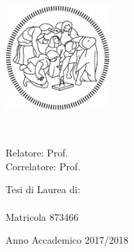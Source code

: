 \begin{titlepage}
    \begin{addmargin}[-1cm]{-3cm}
    \begin{center}
        \large
		\myUni \\
		\myFaculty \\
		\myDepartment \\ \bigskip
		\includegraphics[width=4cm]{gfx/logo} \\ \bigskip
        \vfill

        \begingroup
            \color{Maroon}\spacedallcaps{\myTitle} \\ \bigskip
        \endgroup
	\end{center}
	\vfill
	\begin{flushleft}
		Relatore: Prof. \myProf\\\medskip
		Correlatore: Prof. \myOtherProf
	\end{flushleft}
	\vfill
	\begin{flushright}
		Tesi di Laurea di:\\
		\myName\\
		Matricola 873466
	\end{flushright}
	\vfill
	\begin{center}
		Anno Accademico 2017/2018
	\end{center}
        

  \end{addmargin}
\end{titlepage}
